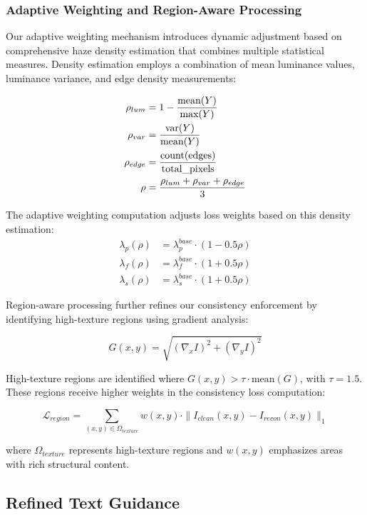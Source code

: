 \documentclass{article}
\begin{document}
\subsubsection{Adaptive Weighting and Region-Aware Processing}

Our adaptive weighting mechanism introduces dynamic adjustment based on comprehensive haze density estimation that combines multiple statistical measures. Density estimation employs a combination of mean luminance values, luminance variance, and edge density measurements:

\begin{align}
\rho_{lum} &= 1 - \frac{\text{mean}(Y)}{\text{max}(Y)} \\
\rho_{var} &= \frac{\text{var}(Y)}{\text{mean}(Y)} \\
\rho_{edge} &= \frac{\text{count}(\text{edges})}{\text{total\textunderscore{}pixels}} \\
\rho &= \frac{\rho_{lum} + \rho_{var} + \rho_{edge}}{3}
\end{align}

The adaptive weighting computation adjusts loss weights based on this density estimation:
\begin{align}
\lambda_p(\rho) &= \lambda_p^{base} \cdot (1 - 0.5\rho) \\
\lambda_f(\rho) &= \lambda_f^{base} \cdot (1 + 0.5\rho) \\
\lambda_s(\rho) &= \lambda_s^{base} \cdot (1 + 0.5\rho)
\end{align}

Region-aware processing further refines our consistency enforcement by identifying high-texture regions using gradient analysis:

\begin{equation}
G(x,y) = \sqrt{(\nabla_x I)^2 + (\nabla_y I)^2}
\end{equation}

High-texture regions are identified where $G(x,y) > \tau \cdot \text{mean}(G)$, with $\tau = 1.5$. These regions receive higher weights in the consistency loss computation:

\begin{equation}
\mathcal{L}_{region} = \sum_{(x,y) \in \Omega_{texture}} w(x,y) \cdot \|I_{clean}(x,y) - I_{recon}(x,y)\|_1
\end{equation}

where $\Omega_{texture}$ represents high-texture regions and $w(x,y)$ emphasizes areas with rich structural content.

\subsection{Refined Text Guidance}
\end{document}
